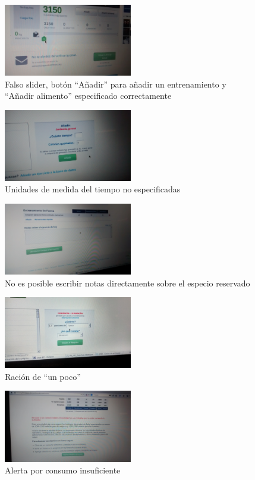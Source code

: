 \documentclass[a4paper]{article}
\begin{document}
			\begin{figure}[!h]
				\centering
				\includegraphics[width=0.5\textwidth]{./figuras/andoni1.jpg}
				\caption{Falso slider, botón ``Añadir'' para añadir un entrenamiento y ``Añadir alimento'' especificado correctamente}
			\end{figure}
			\begin{figure}[!h]
				\centering
				\includegraphics[width=0.5\textwidth]{./figuras/andoni2.jpg}
				\caption{Unidades de medida del tiempo no especificadas}
			\end{figure}
			\begin{figure}[!h]
				\centering
				\includegraphics[width=0.5\textwidth]{./figuras/andoni3.jpg}
				\caption{No es posible escribir notas directamente sobre el especio reservado}
			\end{figure}
			\begin{figure}[!h]
				\centering
				\includegraphics[width=0.5\textwidth]{./figuras/andoni4.jpg}
				\caption{Ración de ``un poco''}
			\end{figure}
			\begin{figure}[!h]
				\centering
				\includegraphics[width=0.5\textwidth]{./figuras/andoni5.jpg}
				\caption{Alerta por consumo insuficiente}
			\end{figure}
		\FloatBarrier
		
\end{document}
